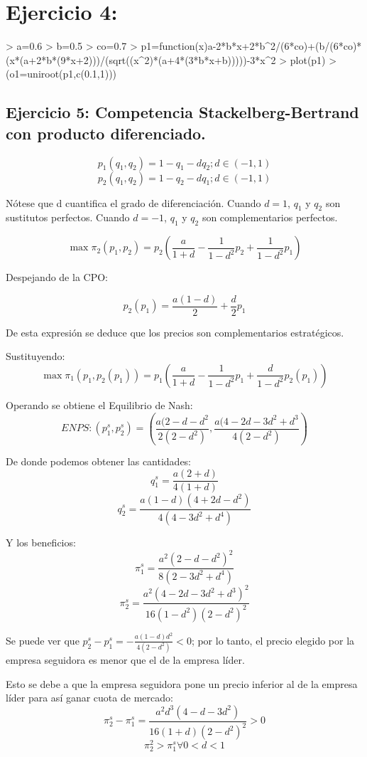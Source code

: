 \documentclass{article}
\theoremstyle{definition}
\theoremstyle{remark}
\begin{document}
\section{Ejercicio 4:}
\begin{Schunk}
\begin{Sinput}
> a=0.6 
> b=0.5 
> co=0.7 
> p1=function(x){a-2*b*x+2*b^2/(6*co)+(b/(6*co)*(x*(a+2*b*(9*x+2)))/(sqrt((x^2)*(a+4*(3*b*x+b)))))-3*x^2}
> plot(p1) 
> (o1=uniroot(p1,c(0.1,1))) 
\end{Sinput}
\begin{Soutput}

\section{Ejercicio 5: Competencia Stackelberg-Bertrand con producto diferenciado.}
$$p_1(q_1,q_2)=1-q_1-dq_2; d\in(-1,1)$$
$$p_2(q_1,q_2)=1-q_2-dq_1; d\in(-1,1)$$

N\'otese que d cuantifica el grado de diferenciaci\'on. Cuando $d=1$, $q_1$ y $q_2$ son sustitutos perfectos. Cuando  $d=-1$, $q_1$ y $q_2$ son complementarios perfectos.

$$\max\pi_2(p_1,p_2)=p_2(\frac{a}{1+d}-\frac{1}{1-d^2}p_2+\frac{1}{1-d^2}p_1)$$

Despejando de la CPO:

$$p_2(p_1)=\frac{a(1-d)}{2}+\frac{d}{2}p_1$$

De esta expresi\'on se deduce que los precios son complementarios estrat\'egicos.

Sustituyendo:
$$\max\pi_1(p_1,p_2(p_1))=p_1(\frac{a}{1+d}-\frac{1}{1-d^2}p_1+\frac{d}{1-d^2}p_2(p_1))$$

Operando se obtiene el Equilibrio de Nash:
$$ENPS:(p_1^s,p_2^s)=(\frac{a(2-d-d^2}{2(2-d^2)},\frac{a(4-2d-3d^2+d^3}{4(2-d^2)})$$

De donde podemos obtener las cantidades:
$$q_1^s=\frac{a(2+d)}{4(1+d)}$$
$$q_2^s=\frac{a(1-d)(4+2d-d^2)}{4(4-3d^2+d^4)}$$

Y los beneficios:
$$\pi_1^s=\frac{a^2(2-d-d^2)^2}{8(2-3d^2+d^4)}$$
$$\pi_2^s=\frac{a^2(4-2d-3d^2+d^3)^2}{16(1-d^2)(2-d^2)^2}$$

Se puede ver que $p_2^s-p_1^s=-\frac{a(1-d)d^2}{4(2-d^2)}<0$; por lo tanto, el precio elegido por la empresa seguidora es menor que el de la empresa l\'ider.


Esto se debe a que la empresa seguidora pone un precio inferior al de la empresa l\'ider para as\'i ganar cuota de mercado:
$$\pi_2^s-\pi_1^s=\frac{a^2d^3(4-d-3d^2)}{16(1+d)(2-d^2)^2}>0$$
$$\pi_2^2>\pi_1^s   \forall   0<d<1$$


\end{Soutput}
\end{Schunk}
\end{document}
